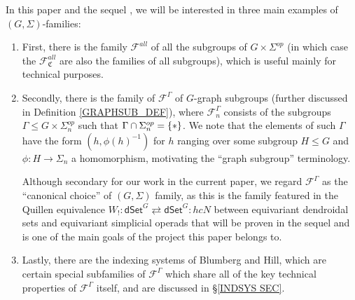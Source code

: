 \documentclass[a4paper,10pt
,draft
]{article}%
\numberwithin{equation}{section}
\numberwithin{figure}{section}
\theoremstyle{definition} %
\newcommand{\F}{\ensuremath{\mathcal F}}
\newcommand{\1}{\ensuremath{\mathbbm 1}}%
\begin{document}
In this paper and the sequel \cite{BP_TAS}, 
we will be interested in three main examples of $(G,\Sigma)$-families:

\begin{enumerate}[label = (\alph*)]
\item First, there is the family $\F^{all}$ of all the subgroups of $G \times \Sigma^{op}$
      (in which case the $\F^{all}_{\mathfrak{C}}$ are also the families of all subgroups), which is useful mainly for technical purposes.
      
\item Secondly, there is the family of $\F^{\Gamma}$
      of $G$-graph subgroups (further discussed in Definition \ref{GRAPHSUB_DEF}), where $\F^{\Gamma}_n$
      consists of the subgroups
      $\Gamma \leq G \times \Sigma_n^{op}$
      such that $\Gamma \cap \Sigma_n^{op} = \{\**\}$.
      We note that the elements of such $\Gamma$
      have the form $(h,\phi(h)^{-1})$
      for $h$ ranging over some subgroup $H \leq G$
      and $\phi \colon H \to \Sigma_n$
      a homomorphism,
      motivating the ``graph subgroup'' terminology.
      
      Although secondary for our work in the current paper, we regard $\F^{\Gamma}$ as the ``canonical choice'' of $(G,\Sigma)$ family, 
      as this is the family featured in the Quillen equivalence
      $W_! \colon 
      \mathsf{dSet}^G \rightleftarrows 
      \mathsf{dSet}^G \colon hcN$
      between equivariant dendroidal sets
      and equivariant simplicial operads
      that will be proven in the sequel and is one of the main goals of the project this paper belongs to.
      
\item Lastly, there are the indexing systems of Blumberg and Hill,
      which are certain special subfamilies of $\F^{\Gamma}$
      which share all of the key technical properties of 
      $\F^{\Gamma}$ itself,
      and are discussed in \S \ref{INDSYS SEC}.
\end{enumerate}
\end{document}

